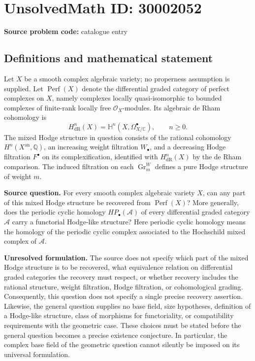 \documentclass[11pt]{article}
\newcommand{\Q}{\mathbb{Q}}
\newcommand{\C}{\mathbb{C}}
\begin{document}
\section*{UnsolvedMath ID: 30002052}
\textbf{Source problem code:} catalogue entry
\subsection{Definitions and mathematical statement}
Let \(X\) be a smooth complex algebraic variety; no properness assumption is supplied. Let \(\operatorname{Perf}(X)\) denote the differential graded category of perfect complexes on \(X\), namely complexes locally quasi-isomorphic to bounded complexes of finite-rank locally free \(\mathcal O_X\)-modules. Its algebraic de Rham cohomology is
\[
H^n_{\mathrm{dR}}(X)=\mathbb H^n(X,\Omega^\bullet_{X/\C}),\qquad n\geq 0.
\]
The mixed Hodge structure in question consists of the rational cohomology \(H^n(X^{\mathrm{an}},\Q)\), an increasing weight filtration \(W_\bullet\), and a decreasing Hodge filtration \(F^\bullet\) on its complexification, identified with \(H^n_{\mathrm{dR}}(X)\) by the de Rham comparison. The induced filtration on each \(\operatorname{Gr}^W_m\) defines a pure Hodge structure of weight \(m\).

\textbf{Source question.} For every smooth complex algebraic variety \(X\), can any part of this mixed Hodge structure be recovered from \(\operatorname{Perf}(X)\)? More generally, does the periodic cyclic homology \(HP_\bullet(\mathcal A)\) of every differential graded category \(\mathcal A\) carry a functorial Hodge-like structure? Here periodic cyclic homology means the homology of the periodic cyclic complex associated to the Hochschild mixed complex of \(\mathcal A\).

\textbf{Unresolved formulation.} The source does not specify which part of the mixed Hodge structure is to be recovered, what equivalence relation on differential graded categories the recovery must respect, or whether recovery includes the rational structure, weight filtration, Hodge filtration, or cohomological grading. Consequently, this question does not specify a single precise recovery assertion. Likewise, the general question supplies no base field, size hypotheses, definition of a Hodge-like structure, class of morphisms for functoriality, or compatibility requirements with the geometric case. These choices must be stated before the general question becomes a precise existence conjecture. In particular, the complex base field of the geometric question cannot silently be imposed on its universal formulation.
\end{document}
